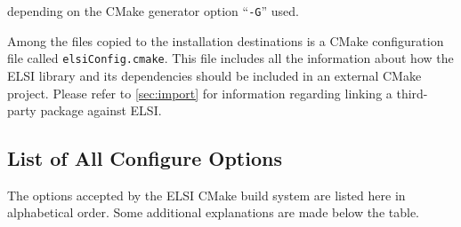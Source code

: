 \documentclass{report}
\begin{document}
depending on the CMake generator option ``\verb+-G+'' used.

Among the files copied to the installation destinations is a CMake configuration file called \texttt{elsiConfig.cmake}.  This file includes all the information about how the ELSI library and its dependencies should be included in an external CMake project.  Please refer to \ref{sec:import} for information regarding linking a third-party package against ELSI.

\subsection{List of All Configure Options}
\label{subsec:config_keywords}
The options accepted by the ELSI CMake build system are listed here in alphabetical order.  Some additional explanations are made below the table.
\end{document}
